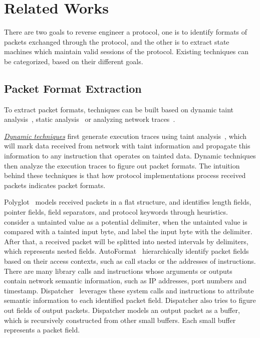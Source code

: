 \section{Related Works}
\label{sec:related}

There are two goals to reverse engineer a protocol, 
one is to identify formats of packets exchanged through the protocol, 
and the other is to extract state machines which maintain valid sessions of the protocol. 
Existing techniques can be categorized, based on their different goals. 



\subsection{Packet Format Extraction}

To extract packet formats, 
techniques can be built based on dynamic taint analysis~\citep{AutoFormat,Polyglot,Dispatcher,ucsb-packet,wangzhi}, 
static analysis~\citep{Junghee} or analyzing network traces~\citep{Discoverer}. 

{\underline{\textit{Dynamic techniques}}}
first generate execution traces using taint analysis~\citep{dawn-taint,taint1,taint-sosp,taint-micro}, 
which will mark data received from network with taint information 
and propagate this information to any instruction that operates on tainted data.
Dynamic techniques then analyze the execution traces to figure out packet formats. 
The intuition behind these techniques is that how protocol implementations 
process received packets indicates packet formats. 

Polyglot~\citep{Polyglot} models received packets in a flat structure, 
and identifies length fields, pointer fields, field separators, 
and protocol keywords through heuristics. 
~\citet{ucsb-packet} consider a untainted value as a potential delimiter, 
when the untainted value is compared with a tainted input byte, 
and label the input byte with the delimiter.
After that, a received packet will be splitted into nested intervals by delimiters, 
which represents nested fields. 
AutoFormat~\citep{AutoFormat} hierarchically identify packet fields based 
on their access contexts, such as call stacks or the addresses of instructions. 
There are many library calls and instructions whose arguments or outputs contain network semantic information, 
such as IP addresses, port numbers and timestamp.
Dispatcher~\citep{Dispatcher} leverages these system calls and 
instructions to attribute semantic information to each identified packet field. 
Dispatcher also tries to figure out fields of output packets. 
Dispatcher models an output packet as a buffer, 
which is recursively constructed from other small buffers. 
Each small buffer represents a packet field. 

